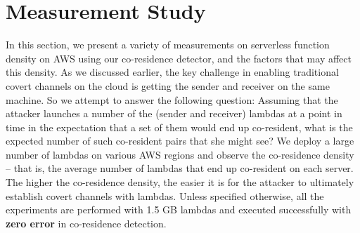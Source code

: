 \section{Measurement Study}
\label{sec:study}


In this section, we present a variety of measurements on serverless function 
density on AWS using our co-residence detector, and the factors that 
may affect this density. As we discussed earlier, 
the key challenge in enabling traditional covert channels on the cloud is 
getting the sender and receiver on the same machine. So we attempt to answer 
the following question: Assuming that the attacker launches a number of the 
(sender and receiver) lambdas at a point in time in the expectation that 
a set of them would end up co-resident, what is the expected number of 
such co-resident pairs that she might see? We deploy a 
large number of lambdas on various AWS regions and observe the co-residence density --
that is, the average number of lambdas that end up co-resident on each server.
The higher the co-residence density, the easier it is for the attacker to 
ultimately establish covert channels with lambdas. Unless specified otherwise, all the
experiments are performed with 1.5 GB lambdas and executed successfully with
\textbf{zero error} in co-residence detection.


